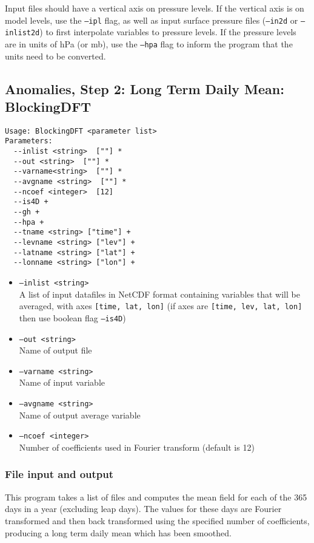 \documentclass{article}
\begin{document}
Input files should have a vertical axis on pressure levels. If the vertical axis is on model levels, use the \texttt{--ipl} flag, as well as input surface pressure files (\texttt{--in2d} or \texttt{--inlist2d}) to first interpolate variables to pressure levels. If the pressure levels are in units of hPa (or mb), use the \texttt{--hpa} flag to inform the program that the units need to be converted.

\subsection{Anomalies, Step 2: Long Term Daily Mean: BlockingDFT}\label{avg}
\begin{verbatim}
Usage: BlockingDFT <parameter list>
Parameters:
  --inlist <string>  [""] *
  --out <string>  [""] *
  --varname<string>  [""] *
  --avgname <string>  [""] *
  --ncoef <integer>  [12]
  --is4D +
  --gh +
  --hpa +
  --tname <string> ["time"] +
  --levname <string> ["lev"] +
  --latname <string> ["lat"] +
  --lonname <string> ["lon"] +
\end{verbatim}

\begin{itemize}
\item[]\texttt{--inlist <string>} \\ A list of input datafiles in NetCDF format containing variables that will be averaged, with axes \texttt{[time, lat, lon]} (if axes are \texttt{[time, lev, lat, lon] } then use boolean flag \texttt{--is4D})
\item[]\texttt{--out <string>} \\ Name of output file
\item[]\texttt{--varname <string>} \\ Name of input variable
\item[]\texttt{--avgname <string>} \\ Name of output average variable
\item[]\texttt{--ncoef <integer>} \\ Number of coefficients used in Fourier transform (default is 12)
\end{itemize}

\subsubsection{File input and output}
This program takes a list of files and computes the mean field for each of the 365 days in a year (excluding leap days). The values for these days are Fourier transformed and then back transformed using the specified number of coefficients, producing a long term daily mean which has been smoothed.
\end{document}
